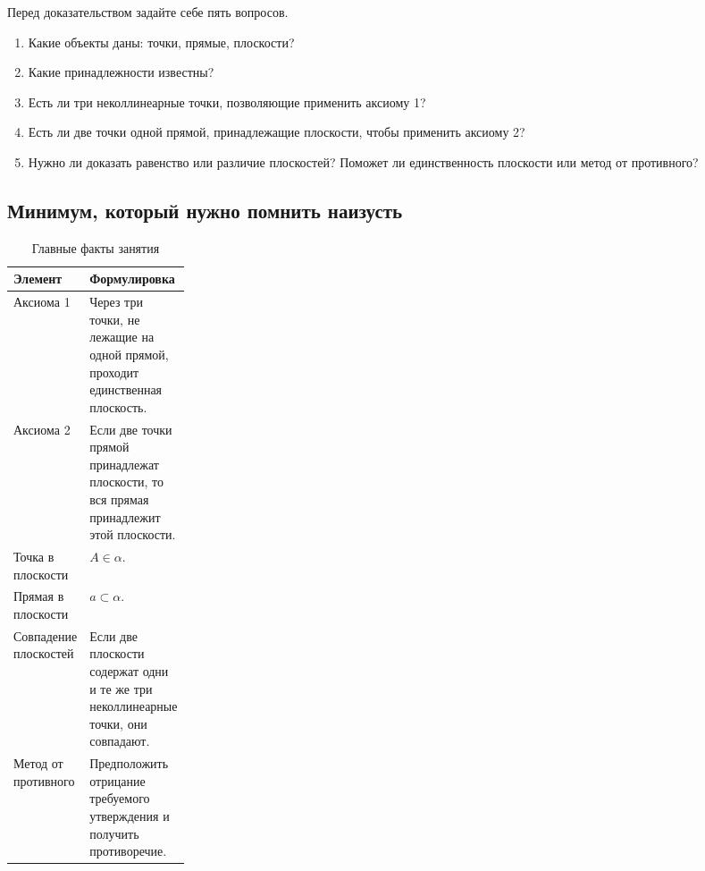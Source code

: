 \documentclass[a4paper,12pt]{article}
\begin{document}
Перед доказательством задайте себе пять вопросов.

\begin{enumerate}
  \item Какие объекты даны: точки, прямые, плоскости?
  \item Какие принадлежности известны?
  \item Есть ли три неколлинеарные точки, позволяющие применить аксиому 1?
  \item Есть ли две точки одной прямой, принадлежащие плоскости, чтобы применить аксиому 2?
  \item Нужно ли доказать равенство или различие плоскостей? Поможет ли единственность плоскости или метод от противного?
\end{enumerate}

\subsection*{\textcolor{accent}{Минимум, который нужно помнить наизусть}}

\begin{table}[h!]
\centering
\caption{Главные факты занятия}
\begin{tabularx}{\linewidth}{@{}p{0.23\linewidth}X@{}}
\toprule
\textbf{Элемент} & \textbf{Формулировка} \\
\midrule
Аксиома 1
&
Через три точки, не лежащие на одной прямой, проходит единственная плоскость.
\\

Аксиома 2
&
Если две точки прямой принадлежат плоскости, то вся прямая принадлежит этой плоскости.
\\

Точка в плоскости
&
$A\in\alpha$.
\\

Прямая в плоскости
&
$a\subset\alpha$.
\\

Совпадение плоскостей
&
Если две плоскости содержат одни и те же три неколлинеарные точки, они совпадают.
\\

Метод от противного
&
Предположить отрицание требуемого утверждения и получить противоречие.
\\
\bottomrule
\end{tabularx}
\end{table}

\end{document}
